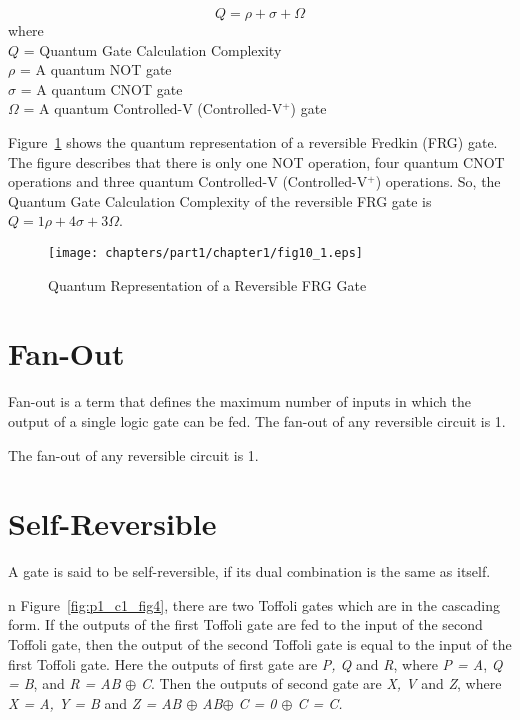 \begin{equation}
Q=\rho+\sigma+\Omega
\end{equation}
\noindent where\\
$Q$ = Quantum Gate Calculation Complexity\\
$\rho$ = A quantum NOT gate \\
$\sigma$ = A quantum CNOT gate \\
$\Omega$ = A quantum Controlled-V (Controlled-V$^+$) gate


\begin{example}\textnormal{
Figure~\ref{fig:p1_c1_fig10_1} shows the quantum representation of a reversible Fredkin (FRG) gate. The figure describes that there is only one NOT operation, four quantum CNOT operations and three quantum Controlled-V (Controlled-V$^+$) operations. So, the Quantum Gate Calculation Complexity of the reversible FRG gate is $Q =1\rho +4\sigma + 3\Omega$.}
\end{example}


\begin{figure}[H]
\centering
\texttt{[image: chapters/part1/chapter1/fig10\_1.eps]}
\caption{Quantum Representation of a Reversible FRG Gate}
\label{fig:p1_c1_fig10_1}
\end{figure}



\section{Fan-Out}
Fan-out is a term that defines the maximum number of inputs in which the output of a single logic gate can be fed. The fan-out of any reversible circuit is 1.
\begin{example}\textnormal{
The fan-out of any reversible circuit is 1.}
\end{example}


\section{Self-Reversible}
A gate is said to be self-reversible, if its dual combination is the same as itself.

\begin{example}\textnormal{
n Figure~\ref{fig:p1_c1_fig4}, there are two Toffoli gates which are in the cascading form. If the outputs of the first Toffoli gate are fed to the input of the second Toffoli gate, then the output of the second Toffoli gate is equal to the input of the first Toffoli gate.
Here the outputs of first gate are \textit{P, Q} and \textit{R}, where \textit{P = A}, \textit{Q = B}, and \textit{R = AB} $\oplus$ \textit{C}. Then the outputs of second gate are \textit{X, V} and \textit{Z}, where \textit{X = A, Y = B} and \textit{Z = AB $\oplus$ AB$\oplus$ C = 0 $\oplus$ C = C.}}
\end{example}



